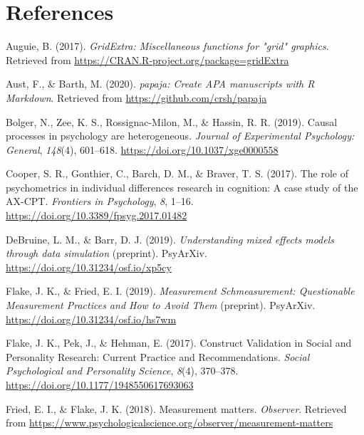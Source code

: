 \documentclass[
  english,
  man,floatsintext]{apa6}
\begin{document}
\newpage

\hypertarget{references}{%
\section{References}\label{references}}

\begingroup
\setlength{\parindent}{-0.5in}
\setlength{\leftskip}{0.5in}

\hypertarget{refs}{}
\leavevmode\hypertarget{ref-R-gridExtra}{}%
Auguie, B. (2017). \emph{GridExtra: Miscellaneous functions for "grid" graphics}. Retrieved from \url{https://CRAN.R-project.org/package=gridExtra}

\leavevmode\hypertarget{ref-R-papaja}{}%
Aust, F., \& Barth, M. (2020). \emph{papaja: Create APA manuscripts with R Markdown}. Retrieved from \url{https://github.com/crsh/papaja}

\leavevmode\hypertarget{ref-bolger_causal_2019}{}%
Bolger, N., Zee, K. S., Rossignac-Milon, M., \& Hassin, R. R. (2019). Causal processes in psychology are heterogeneous. \emph{Journal of Experimental Psychology: General}, \emph{148}(4), 601--618. \url{https://doi.org/10.1037/xge0000558}

\leavevmode\hypertarget{ref-cooper_role_2017}{}%
Cooper, S. R., Gonthier, C., Barch, D. M., \& Braver, T. S. (2017). The role of psychometrics in individual differences research in cognition: A case study of the AX-CPT. \emph{Frontiers in Psychology}, \emph{8}, 1--16. \url{https://doi.org/10.3389/fpsyg.2017.01482}

\leavevmode\hypertarget{ref-debruine_understanding_2019}{}%
DeBruine, L. M., \& Barr, D. J. (2019). \emph{Understanding mixed effects models through data simulation} (preprint). PsyArXiv. \url{https://doi.org/10.31234/osf.io/xp5cy}

\leavevmode\hypertarget{ref-flake_measurement_2019}{}%
Flake, J. K., \& Fried, E. I. (2019). \emph{Measurement Schmeasurement: Questionable Measurement Practices and How to Avoid Them} (preprint). PsyArXiv. \url{https://doi.org/10.31234/osf.io/hs7wm}

\leavevmode\hypertarget{ref-flake_construct_2017}{}%
Flake, J. K., Pek, J., \& Hehman, E. (2017). Construct Validation in Social and Personality Research: Current Practice and Recommendations. \emph{Social Psychological and Personality Science}, \emph{8}(4), 370--378. \url{https://doi.org/10.1177/1948550617693063}

\leavevmode\hypertarget{ref-fried_measurement_2018}{}%
Fried, E. I., \& Flake, J. K. (2018). Measurement matters. \emph{Observer}. Retrieved from \url{https://www.psychologicalscience.org/observer/measurement-matters}
\end{document}
